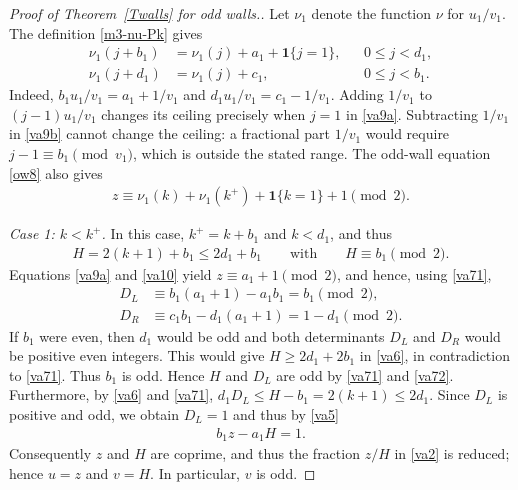 \documentclass[11pt,reqno,tbtags,a4paper]{amsart}
\numberwithin{equation}{section}
\renewcommand\le{\leq}
\renewcommand\ge{\geq}
\renewcommand\leq{\leqslant}
\renewcommand\geq{\geqslant}
\theoremstyle{plain}%
\theoremstyle{definition}
\theoremstyle{remark}
\newcommand\pfcase[2]{\smallskip\noindent\emph{Case #1: #2} \noindent}
\newcommand{\refT}[1]{Theorem~\ref{#1}}
\newcommand\xcpar[1]{\{#1\}}
\newcommand\indic[1]{\boldsymbol1\xcpar{#1}}
\newcommand\kx{{k^+}}
\newcommand\0{{\boldsymbol 0}}
\newcommand\1{{\boldsymbol 1}}
\begin{document}
\begin{proof}[Proof of \refT{Twalls} for odd walls.]
Let $\nu_1$ denote the function $\nu$ for $u_1/v_1$.
The definition \eqref{m3-nu-Pk} %
gives
\begin{align}
 \nu_1(j+b_1)&=\nu_1(j)+a_1+\indic{j=1},
 &&0\le j<d_1,\label{va9a}\\
 \nu_1(j+d_1)&=\nu_1(j)+c_1,
 &&0\le j<b_1.\label{va9b}
\end{align}
Indeed, $b_1u_1/v_1=a_1+1/v_1$ and
$d_1u_1/v_1=c_1-1/v_1$. 
%
Adding $1/v_1$ to
$(j-1)u_1/v_1$ changes its ceiling precisely when $j=1$ in
\eqref{va9a}. Subtracting $1/v_1$ in \eqref{va9b} cannot change the
ceiling: a fractional part $1/v_1$ would require
$j-1\equiv b_1\pmod{v_1}$, which is outside the stated range.
%
%
The odd-wall equation \eqref{ow8} also gives
\begin{align}\label{va10}
 z\equiv \nu_1(k)+\nu_1(\kx)+\indic{k=1}+1\pmod2.
\end{align}

\pfcase1{$k<\kx$.}
%
In this case,
$\kx=k+b_1$ and $k<d_1$, and thus
\begin{align}\label{va71}
H=2(k+1)+b_1\le2d_1+b_1
\qquad\text{with}\qquad 
H\equiv b_1 \pmod2.
\end{align}
Equations \eqref{va9a} and \eqref{va10} yield $z\equiv a_1+1\pmod2$,
and hence, using \eqref{va71},
\begin{align}\label{va72}
 D_L
&\equiv b_1(a_1+1) -a_1b_1
= b_1\pmod2,
\\ \label{va73}
D_R&\equiv c_1b_1-d_1(a_1+1)
=1-d_1\pmod2.
\end{align}
If $b_1$ were even, then $d_1$ would be odd and both determinants
$D_L$ and $D_R$
would be positive even integers. This would give
$H\ge2d_1+2b_1$ in \eqref{va6}, in contradiction to \eqref{va71}.
Thus $b_1$ is odd. 
Hence $H$ and $D_L$ are odd by \eqref{va71} and \eqref{va72}. 
Furthermore, by \eqref{va6} and \eqref{va71},
$d_1D_L\le H-b_1=2(k+1)\le2d_1$.
Since $D_L$ is positive and odd, we obtain
$D_L=1$ and thus by \eqref{va5}
\begin{align}\label{va11a}
 b_1z-a_1H=1.
\end{align}
Consequently $z$ and $H$ are coprime, 
%
and thus the fraction $z/H$ in \eqref{va2} is reduced; 
hence $u=z$ and $v=H$. In particular, $v$ is odd.


\end{proof}
\end{document}
